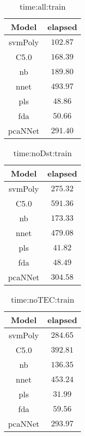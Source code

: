 \begin{table}[!ht]
	\centering
	\begin{tabular}{|c|c|}
		\hline
		Model & elapsed \\ \hline
		svmPoly & $102.87$ \\ \hline
		C5.0 & $168.39$ \\ \hline
		nb & $189.80$ \\ \hline
		nnet & $493.97$ \\ \hline
		pls & $48.86$ \\ \hline
		fda & $50.66$ \\ \hline
		pcaNNet & $291.40$ \\ \hline
	\end{tabular}
	\caption{time:all:train}
	\label{tab:time:all:train}
\end{table}

\begin{table}[!ht]
	\centering
	\begin{tabular}{|c|c|}
		\hline
		Model & elapsed \\ \hline
		svmPoly & $275.32$ \\ \hline
		C5.0 & $591.36$ \\ \hline
		nb & $173.33$ \\ \hline
		nnet & $479.08$ \\ \hline
		pls & $41.82$ \\ \hline
		fda & $48.49$ \\ \hline
		pcaNNet & $304.58$ \\ \hline
	\end{tabular}
	\caption{time:noDst:train}
	\label{tab:time:noDst:train}
\end{table}

\begin{table}[!ht]
	\centering
	\begin{tabular}{|c|c|}
		\hline
		Model & elapsed \\ \hline
		svmPoly & $284.65$ \\ \hline
		C5.0 & $392.81$ \\ \hline
		nb & $136.35$ \\ \hline
		nnet & $453.24$ \\ \hline
		pls & $31.99$ \\ \hline
		fda & $59.56$ \\ \hline
		pcaNNet & $293.97$ \\ \hline
	\end{tabular}
	\caption{time:noTEC:train}
	\label{tab:time:noTEC:train}
\end{table}

